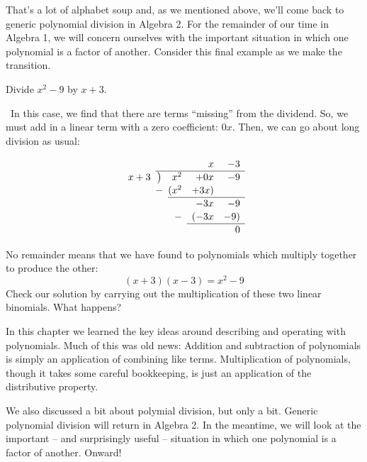 That's a lot of alphabet soup and, as we mentioned above, we'll come back to generic polynomial division in Algebra 2. For the remainder of our time in Algebra 1, we will concern ourselves with the important situation in which one polynomial is a factor of another. Consider this final example as we make the transition.

\begin{boxedex}
Divide $x^2-9$ by $x+3$.

\exsoln\ In this case, we find that there are terms ``missing'' from the dividend. So, we must add in a linear term with a zero coefficient: $0x$. Then, we can go about long division as usual:

\[
\renewcommand\arraystretch{1.1}
\begin{array}{*1r @{\hskip\arraycolsep}c@{\hskip\arraycolsep} *3r}
		&	~	&&x&-3\\
\cline{2-5}
x+3	&\big)	&x^2&+0x&-9\\
		&-		&(x^2&+3x)\\
\cline{3-5}
		&		&&-3x&-9\\
		&		&-&(-3x&-9)\\
\cline{4-5}
		&		&&&0
\end{array}
\]

No remainder means that we have found to polynomials which multiply together to produce the other:
\[(x+3)(x-3) = x^2 - 9\]
Check our solution by carrying out the multiplication of these two linear binomials. What happens?
\end{boxedex}

\chaptersummary

In this chapter we learned the key ideas around describing and operating with polynomials. Much of this was old news: Addition and subtraction of polynomials is simply an application of combining like terms. Multiplication of polynomials, though it takes some careful bookkeeping, is just an application of the distributive property.

We also discussed a bit about polymial division, but only a bit. Generic polynomial division will return in Algebra 2. In the meantime, we will look at the important -- and surprisingly useful -- situation in which one polynomial is a factor of another. Onward!
